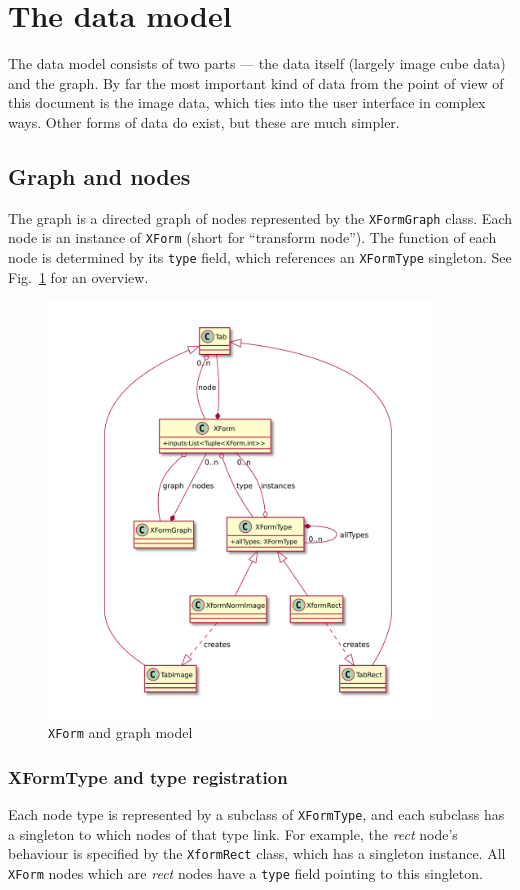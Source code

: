 

\section{The data model}
The data model consists of two parts --- the data itself (largely
image cube data) and the graph. By far the most important kind of data
from the point of view of this document is the image data, which ties
into the user interface in complex ways. Other forms of data do exist,
but these are much simpler.


\subsection{Graph and nodes}
The graph is a directed graph of nodes represented by the 
\texttt{XFormGraph} class. Each node is an instance of \texttt{XForm}
(short for ``transform node''). The function of each node is
determined by its \texttt{type} field, which references an
\texttt{XFormType} singleton. See Fig.~\ref{xform.pdf} for an overview.

\begin{figure}[ht]
\center
\includegraphics[width=4in]{xform.pdf}
\caption{\texttt{XForm} and graph model}
\label{xform.pdf}
\end{figure}

\subsubsection{XFormType and type registration}
\label{xformtype}
Each node type is represented by a subclass of \texttt{XFormType},
and each subclass has a singleton to which nodes of that type link.
For example, the \emph{rect} node's behaviour is specified by
the \texttt{XformRect} class, which has a singleton instance. All
\texttt{XForm} nodes which are \emph{rect} nodes have a \texttt{type} field
pointing to this singleton.

